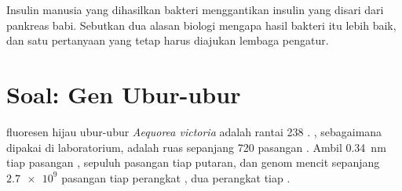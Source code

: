 \begin{exercise}[$\star\star\star$]\label{exo:g10:universal-dna:15}
Insulin manusia yang dihasilkan bakteri menggantikan insulin yang
disari dari pankreas babi. Sebutkan dua alasan biologi mengapa hasil
bakteri itu lebih baik, dan satu pertanyaan yang tetap harus diajukan
lembaga pengatur.
\end{exercise}

\section{Soal: Gen Ubur-ubur}

\begin{problem}
\label{pb:g10:universal-dna:1}
 fluoresen hijau ubur-ubur \emph{Aequorea victoria}
adalah rantai 238 . , sebagaimana dipakai di
laboratorium, adalah ruas  sepanjang 720 pasangan . Ambil
\qty{0.34}{nm} tiap pasangan , sepuluh pasangan  tiap putaran,
dan genom mencit sepanjang $\num{2.7e9}$ pasangan  tiap perangkat
, dua perangkat tiap .


\end{problem}
